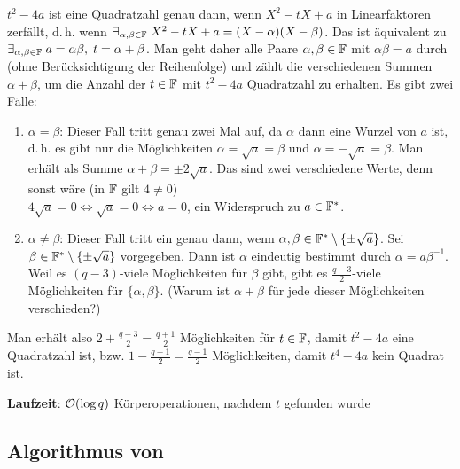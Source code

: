 \begin{Beweis}
    $t^2 - 4a$ ist eine Quadratzahl genau dann, wenn $X^2 - tX + a$ in Linearfaktoren zerfällt,
    d.\,h. wenn $\exists_{\alpha, \beta \in \mathbb{F}}\; X^2 - tX + a = (X - \alpha)(X - \beta)$.
    Das ist äquivalent zu
    $\exists_{\alpha, \beta \in \mathbb{F}}\; a = \alpha\beta,\; t = \alpha + \beta$.
    Man geht daher alle Paare $\alpha, \beta \in \mathbb{F}$ mit $\alpha\beta = a$ durch
    (ohne Berücksichtigung der Reihenfolge)
    und zählt die verschiedenen Summen $\alpha + \beta$,
    um die Anzahl der $t \in \mathbb{F}$ mit $t^2 - 4a$ Quadratzahl zu erhalten.
    Es gibt zwei Fälle:
    \begin{enumerate}
        \item
        $\alpha = \beta$:
        Dieser Fall tritt genau zwei Mal auf, da $\alpha$ dann eine Wurzel von $a$ ist,
        d.\,h. es gibt nur die Möglichkeiten $\alpha = \sqrt{a} = \beta$ und
        $\alpha = -\sqrt{a} = \beta$.
        Man erhält als Summe $\alpha + \beta = \pm 2\sqrt{a}$.
        Das sind zwei verschiedene Werte, denn sonst wäre (in $\mathbb{F}$ gilt $4 \not= 0$)\\
        $4\sqrt{a} = 0 \iff \sqrt{a} = 0 \iff a = 0$, ein Widerspruch zu $a \in \mathbb{F}^\ast$.
        
        \item
        $\alpha \not= \beta$:
        Dieser Fall tritt ein genau dann, wenn
        $\alpha, \beta \in \mathbb{F}^\ast \setminus \{\pm\sqrt{a}\}$.
        Sei $\beta \in \mathbb{F}^\ast \setminus \{\pm\sqrt{a}\}$ vorgegeben.
        Dann ist $\alpha$ eindeutig bestimmt durch $\alpha = a\beta^{-1}$.
        Weil es $(q - 3)$-viele Möglichkeiten für $\beta$ gibt,
        gibt es $\frac{q-3}{2}$-viele Möglichkeiten für $\{\alpha, \beta\}$.
        (Warum ist $\alpha + \beta$ für jede dieser Möglichkeiten verschieden?)
    \end{enumerate}
    Man erhält also $2 + \frac{q-3}{2} = \frac{q+1}{2}$ Möglichkeiten für $t \in \mathbb{F}$,
    damit $t^2 - 4a$ eine Quadratzahl ist,
    bzw. $1 - \frac{q+1}{2} = \frac{q-1}{2}$ Möglichkeiten, damit $t^4 - 4a$ kein Quadrat ist.
\end{Beweis}

\linie

\textbf{Laufzeit}:
$\mathcal{O}(\log q)$ Körperoperationen, nachdem $t$ gefunden wurde

\pagebreak

\subsection{%
    Algorithmus von %
}

